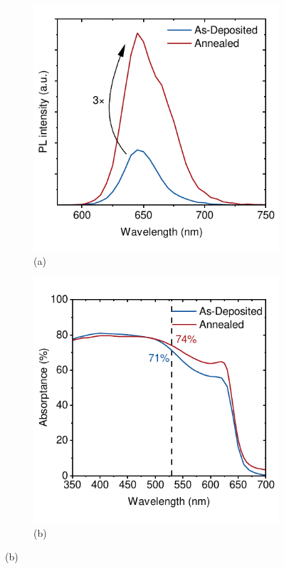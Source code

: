 \begin{figure}[htbp]
    \centering
    \begin{subfigure}[t]{0.45\textwidth}
        \centering
        \includegraphics[width=\textwidth]{chapters/material_properties/images/SSPL.pdf} %
        \caption*{(a)}
    \end{subfigure}
    \hfill
    \begin{subfigure}[t]{0.45\textwidth}
        \centering
        \includegraphics[width=\textwidth]{chapters/material_properties/images/Absorptance.pdf} %
        \caption*{(b)}
    \end{subfigure}


\end{figure}
